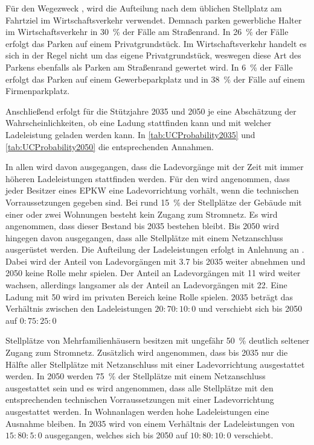 Für den Wegezweck \dienstdot, wird die Aufteilung nach dem üblichen Stellplatz am Fahrtziel im Wirtschaftsverkehr verwendet. \cite{Rikus2015}
Demnach parken gewerbliche Halter im Wirtschaftsverkehr in \SI{30}{\percent} der Fälle am Straßenrand.
In \SI{26}{\percent} der Fälle erfolgt das Parken auf einem Privatgrundstück.
Im Wirtschaftsverkehr handelt es sich in der Regel nicht um das eigene Privatgrundstück, weswegen diese Art des Parkens ebenfalls als Parken am Straßenrand gewertet wird.
In \SI{6}{\percent} der Fälle erfolgt das Parken auf einem Gewerbeparkplatz und in \SI{38}{\percent} der Fälle auf einem Firmenparkplatz.\medskip

Anschließend erfolgt für die Stützjahre \num{2035} und \num{2050} je \UC eine Abschätzung der Wahrscheinlichkeiten, ob eine Ladung stattfinden kann und mit welcher Ladeleistung geladen werden kann.
In \autoref{tab:UCProbability2035} und \autoref{tab:UCProbability2050} die entsprechenden Annahmen.



In allen \UCs wird davon ausgegangen, dass die Ladevorgänge mit der Zeit mit immer höheren Ladeleistungen stattfinden werden.
Für den \UC \Eigenheim wird angenommen, dass jeder Besitzer eines \gls{EPKW} eine Ladevorrichtung vorhält, wenn die technischen Vorraussetzungen gegeben sind.
Bei rund \SI{15}{\percent} der Stellplätze der Gebäude mit einer oder zwei Wohnungen besteht kein Zugang zum Stromnetz. \cite{dena2020}
Es wird angenommen, dass dieser Bestand bis \num{2035} bestehen bleibt.
Bis \num{2050} wird hingegen davon ausgegangen, dass alle Stellplätze mit einem Netzanschluss ausgerüstet werden.
Die Aufteilung der Ladeleistungen erfolgt in Anlehnung an \cite{NPZMAVE2020}.
Dabei wird der Anteil von Ladevorgängen mit \SI{3.7}{\kw} bis \num{2035} weiter abnehmen und \num{2050} keine Rolle mehr spielen.
Der Anteil an Ladevorgängen mit \SI{11}{\kw} wird weiter wachsen, allerdings langsamer als der Anteil an Ladevorgängen mit \SI{22}{\kw}.
Eine Ladung mit \SI{50}{\kw} wird im privaten Bereich keine Rolle spielen.
\num{2035} beträgt das Verhältnis zwischen den Ladeleistungen \(20:70:10:0\) und verschiebt sich bis \num{2050} auf \(0:75:25:0\)\medskip

Stellplätze von Mehrfamilienhäusern besitzen mit ungefähr \SI{50}{\percent} deutlich seltener Zugang zum Stromnetz. \cite{dena2020}
Zusätzlich wird angenommen, dass bis \num{2035} nur die Hälfte aller Stellplätze mit Netzanschluss mit einer Ladevorrichtung ausgestattet werden.
In \num{2050} werden \SI{75}{\percent} der Stellplätze mit einem Netzanschluss ausgestattet sein und es wird angenommen, dass alle Stellplätze mit den entsprechenden technischen Vorraussetzungen mit einer Ladevorrichtung ausgestattet werden.
In Wohnanlagen werden hohe Ladeleistungen eine Ausnahme bleiben.
In \num{2035} wird von einem Verhältnis der Ladeleistungen von \(15:80:5:0\) ausgegangen, welches sich bis \num{2050} auf \(10:80:10:0\) verschiebt.\medskip

